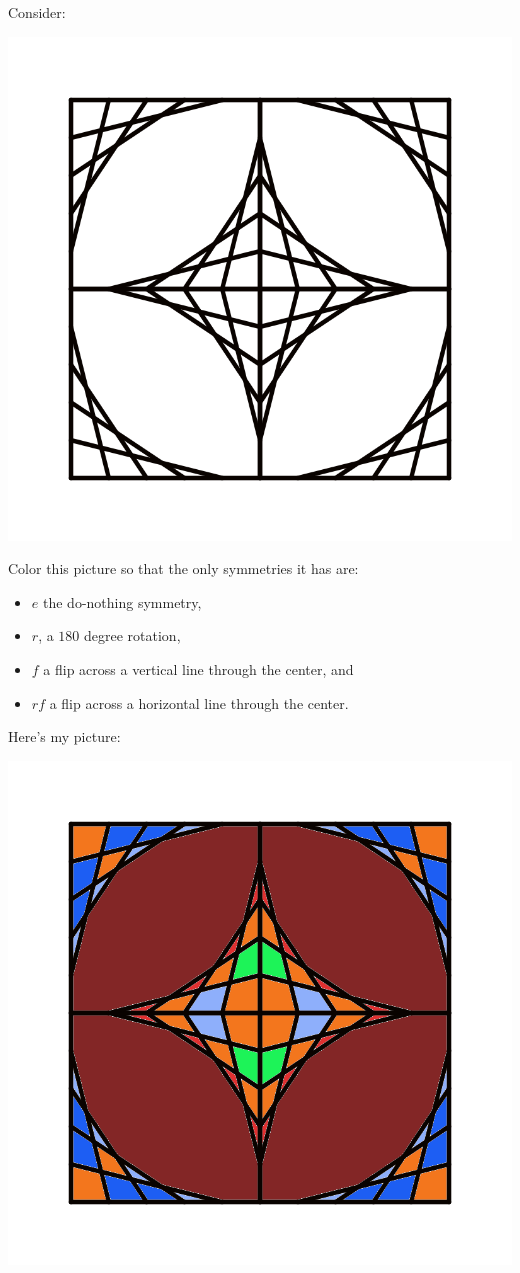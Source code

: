 \documentclass[noauthor,nooutcomes,hints]{ximera}
\begin{document}
\begin{question}
  Consider:
   \begin{center}
  \includegraphics[width=.6\textwidth]{etD4.png}
 \end{center}
   Color this picture so that the only symmetries it has are:
   \begin{itemize}
   \item $e$ the do-nothing symmetry,
   \item $r$, a $180$ degree rotation, 
   \item $f$ a flip across a vertical line through the center, and
   \item $rf$ a flip across a horizontal line through the center.
   \end{itemize}
   \begin{freeResponse}
   Here's my picture:
   \begin{center}
     \includegraphics[width=.6\textwidth]{ciD4.png}
   \end{center}
 \end{freeResponse}

\end{question}
\mynewpage
\end{document}
